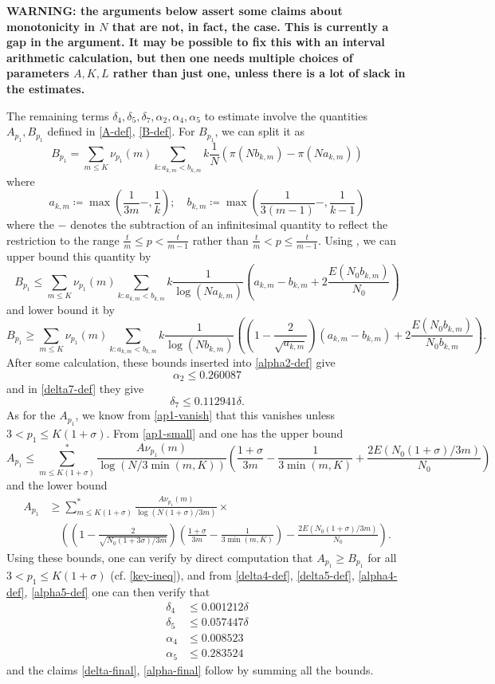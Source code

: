 \documentclass[12pt,a4paper,reqno]{amsart}
\numberwithin{equation}{section}
\theoremstyle{plain}
\theoremstyle{definition}
\begin{document}
{\bf WARNING: the arguments below assert some claims about monotonicity in $N$ that are not, in fact, the case.  This is currently a gap in the argument.  It may be possible to fix this with an interval arithmetic calculation, but then one needs multiple choices of parameters $A,K,L$ rather than just one, unless there is a lot of slack in the estimates.}

The remaining terms $\delta_4, \delta_5, \delta_7, \alpha_2, \alpha_4, \alpha_5$ to estimate involve the quantities $A_{p_1}, B_{p_1}$ defined in \eqref{A-def}, \eqref{B-def}.  For $B_{p_1}$, we can split it as
$$ B_{p_1} = \sum_{m \leq K} \nu_{p_1}(m) \sum_{k: a_{k,m} < b_{k,m}} k \frac{1}{N} (\pi( N b_{k,m} ) - \pi(N a_{k,m}))$$
where 
$$ a_{k,m} \coloneqq \max\left( \frac{1}{3m}-, \frac{1}{k} \right); \quad b_{k,m} \coloneqq \max\left( \frac{1}{3(m-1)}-, \frac{1}{k-1} \right)$$
where the $-$ denotes the subtraction of an infinitesimal quantity to reflect the restriction to the range $\frac{t}{m} \leq p < \frac{t}{m-1}$ rather than
$\frac{t}{m} < p \leq \frac{t}{m-1}$.  Using , we can upper bound this quantity by
$$ B_{p_1} \leq \sum_{m \leq K} \nu_{p_1}(m) \sum_{k: a_{k,m} < b_{k,m}} k \frac{1}{\log(N a_{k,m})} \left( a_{k,m}-b_{k,m} + 2\frac{E(N_0 b_{k,m})}{N_0} \right)$$
and lower bound it by
$$ B_{p_1} \geq \sum_{m \leq K} \nu_{p_1}(m) \sum_{k: a_{k,m} < b_{k,m}} k \frac{1}{\log(N b_{k,m})} \left( \left(1-\frac{2}{\sqrt{a_{k,m}}}\right) (a_{k,m}-b_{k,m}) + 2\frac{E(N_0 b_{k,m})}{N_0 b_{k,m}} \right).$$
After some calculation, these bounds inserted into \eqref{alpha2-def} give
$$ \alpha_2 \leq 0.260087$$
and in \eqref{delta7-def} they give
$$ \delta_7 \leq 0.112941 \delta.$$
As for the $A_{p_1}$, we know from \eqref{ap1-vanish} that this vanishes unless $3 < p_1 \leq K(1+\sigma)$.  From \eqref{ap1-small} and  one has the upper bound
$$
A_{p_1} \leq \sum_{m \leq K(1+\sigma)}^* \frac{A \nu_{p_1}(m)}{\log(N/3\min(m,K))} \left( \frac{1+\sigma}{3m} - \frac{1}{3\min(m,K)} + \frac{2E(N_0(1+\sigma)/3m)}{N_0} \right) $$
and the lower bound
\begin{align*}
A_{p_1} &\geq \sum_{m \leq K(1+\sigma)}^* \frac{A \nu_{p_1}(m)}{\log(N(1+\sigma)/3m)} \times \\
& \quad \left( \left(1-\frac{2}{\sqrt{N_0(1+3\sigma)/3m}}\right) \left(\frac{1+\sigma}{3m} - \frac{1}{3\min(m,K)}\right) - \frac{2E(N_0(1+\sigma)/3m)}{N_0} \right).
\end{align*}
Using these bounds, one can verify by direct computation that $A_{p_1} \geq B_{p_1}$ for all $3 < p_1 \leq K(1+\sigma)$ (cf. \eqref{key-ineq}), and from \eqref{delta4-def}, \eqref{delta5-def}, \eqref{alpha4-def}, \eqref{alpha5-def} one can then verify that
\begin{align*}
\delta_4 &\leq 0.001212 \delta \\
\delta_5 &\leq 0.057447 \delta \\
\alpha_4 &\leq 0.008523 \\
\alpha_5 &\leq 0.283524
\end{align*}
and the claims \eqref{delta-final}, \eqref{alpha-final} follow by summing all the bounds.
\end{document}
